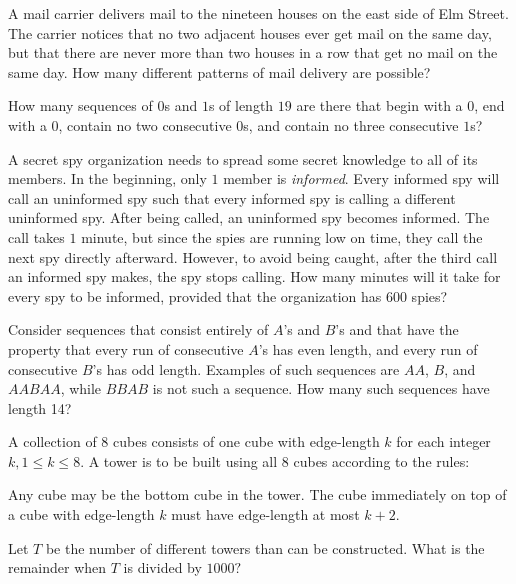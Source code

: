 \documentclass[11pt][mast]{lucky}
\begin{document}
\begin{prob}[AIME I 2001/14]{3}
A mail carrier delivers mail to the nineteen houses on the east side of Elm Street. The carrier notices that no two adjacent houses ever get mail on the same day, but that there are never more than two houses in a row that get no mail on the same day. How many different patterns of mail delivery are possible?
\end{prob}

\begin{prob}[AMC 12B 2019/23]{3}
How many sequences of $0$s and $1$s of length $19$ are there that begin with a $0$, end with a $0$, contain no two consecutive $0$s, and contain no three consecutive $1$s?
\end{prob}

\begin{prob}{3}
A secret spy organization needs to spread some secret knowledge to all of its members. In the beginning, only $1$ member is \textit{informed}. Every informed spy will call an uninformed spy such that every informed spy is calling a different uninformed spy. After being called, an uninformed spy becomes informed. The call takes $1$ minute, but since the spies are running low on time, they call the next spy directly afterward. However, to avoid being caught, after the third call an informed spy makes, the spy stops calling. How many minutes will it take for every spy to be informed, provided that the organization has $600$ spies?
\end{prob}


\begin{prob}[AIME 2008 I/11]{3}
Consider sequences that consist entirely of $ A$'s and $ B$'s and that have the property that every run of consecutive $ A$'s has even length, and every run of consecutive $ B$'s has odd length. Examples of such sequences are $ AA$, $ B$, and $ AABAA$, while $ BBAB$ is not such a sequence. How many such sequences have length 14?
\end{prob}


\begin{prob}[AIME I 2006/11]{3}

A collection of $8$ cubes consists of one cube with edge-length $k$ for each integer $k, 1 \le k \le 8.$ A tower is to be built using all $8$ cubes according to the rules:
\begin{itemize}
    \Item Any cube may be the bottom cube in the tower.
    \Item The cube immediately on top of a cube with edge-length $k$ must have edge-length at most $k+2.$
\end{itemize}
Let $T$ be the number of different towers than can be constructed. What is the remainder when $T$ is divided by $1000?$
\end{prob}
\end{document}
